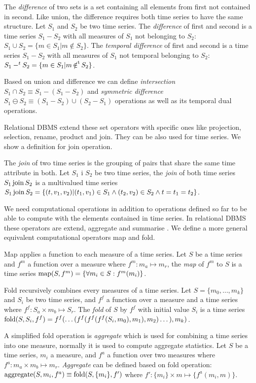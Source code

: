 The \emph{difference} of two sets is a set containing all elements
from first not contained in second. Like union, the difference
requires both time series to have the same structure. %
Let $S_1$ and $S_2$ be two time series. The \emph{difference} of first
and second is a time series $S_1 - S_2$ with all measures of $S_1$ not
belonging to $S_2$: $S_1 \cup S_2 = \{ m \in S_1 | m \notin S_2
\}$. The \emph{temporal difference} of first and second is a time
series $S_1 - S_2$ with all measures of $S_1$ not temporal belonging
to $S_2$: $S_1 -^t S_2 = \{ m \in S_1 | m \operatorname*{\notin^t} S_2 \}$.


Based on union and difference we can define \emph{intersection} $S_1\cap
S_2 \equiv S_1 - (S_1 - S_2)$ and \emph{symmetric difference} $S_1 \ominus
S_2 \equiv (S_1 - S_2) \cup (S_2 - S_1)$ operations as well as its
temporal dual operations.


Relational DBMS extend these set operators with specific ones like
projection, selection, rename, product and join. They can be also used
for time series. We show a definition for join operation.


The \emph{join} of two time series is the grouping of pairs that share
the same time attribute in both.  Let $S_1$ i $S_2$ be two time series,
the \emph{join} of both time series $S_1 \operatorname*{join} S_2$ is a multivalued
time series $S_1 \operatorname*{join} S_2 = \{ (t,v_1,v_2) | (t_1,v_1) \in S_1 \wedge
(t_2,v_2) \in S_2 \wedge t=t_1=t_2 \}$.


We need computational operations in addition to operations defined so
far to be able to compute with the elements contained in time
series. In relational DBMS these operators are extend, aggregate and
summarise \cite{date:introduction}. We define a more general
equivalent computational operators map and fold.


Map applies a function to each measure of a time series.  Let $S$ be a
time series and $f^m$ a function over a measure where $f^m:m_a\mapsto
m_r$, the \emph{map} of $f^m$ to $S$ is a time series $\operatorname*{map}(S,f^m) =
\{\forall m_i\in S : f^m(m_i) \}$.

Fold recursively combines every measures of a time series.  Let
$S=\{m_0, \dotsc, m_k\}$ and $S_i$ be two time series, and $f^f$ a
function over a measure and a time series where $f^f: S_a \times m_b
\mapsto S_r$. The \emph{fold} of $S$ by $f^f$ with initial value $S_i$ is a
time series $\operatorname*{fold}(S,S_i,f^f) = f^f(\dots(
f^f(f^f(f^f(S_i,m_0),\allowbreak m_1),\allowbreak m_2
)\dots),\allowbreak m_k)$.


A simplified fold operation is \emph{aggregate} which
is used for combining a time series into one measure, normally it is
used to compute aggregate statistics.  Let $S$ be a time series, $m_i$
a measure, and $f^a$ a function over two measures where $f^a: m_a
\times m_b \mapsto m_r$.  \emph{Aggregate} can be defined based on
fold operation: $\operatorname*{aggregate}(S,m_i,f^a) \equiv \operatorname*{fold}(S,\{m_i\},f')$ where $f':
\{m_i\} \times m \mapsto \{f^a(m_i,m)\}$.

